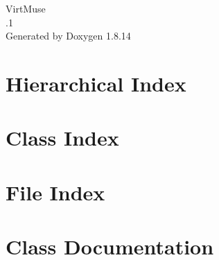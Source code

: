 \documentclass[twoside]{book}
\newcommand{\+}{\discretionary{\mbox{\scriptsize$\hookleftarrow$}}{}{}}
\newcommand{\clearemptydoublepage}{%
  \newpage{\pagestyle{empty}\cleardoublepage}%
}
\begin{document}
\hypersetup{pageanchor=false,
             bookmarksnumbered=true,
             pdfencoding=unicode
            }
\begin{titlepage}
\vspace*{7cm}
\begin{center}%
{\Large Virt\+Muse \\[1ex]\large .1 }\\
\vspace*{1cm}
{\large Generated by Doxygen 1.8.14}\\
\end{center}
\end{titlepage}
\clearemptydoublepage
{}
\tableofcontents
\clearemptydoublepage
{}
\hypersetup{pageanchor=true}

\chapter{Hierarchical Index}

\chapter{Class Index}

\chapter{File Index}

\chapter{Class Documentation}




















































\end{document}
